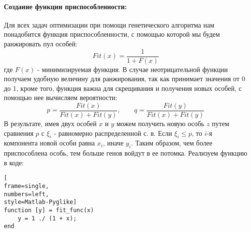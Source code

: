 \documentclass[12pt]{article}
\begin{document}
\paragraph{Создание функции приспособленности:} Для всех задач оптимизации при помощи генетического алгоритма нам понадобится функция приспособленности, с помощью которой мы будем ранжировать пул особей:
$$
Fit(x) = \frac{1}{1 + F(x)}
$$
где $F(x)$ - минимизируемая функция. В случае неотрицательной функции получаем удобную величину для ранжирования, так как принимает значения от 0 до 1, кроме того, функция важна для скрещивания и получения новых особей, с помощью нее вычисляем вероятности:
$$
p = \frac{Fit(x)}{Fit(x) + Fit(y)} , \qquad q = \frac{Fit(y)}{Fit(x) + Fit(y)}
$$
В результате, имея двух особей $x$ и $y$ можем получить новую особь $z$ путем сравнения $p$ с $\xi_i$ - равномерно распределенной с. в. Если $\xi_i \leq p$, то $i$-я компонента новой особи равна $x_i$, иначе $y_i$. Таким образом, чем более приспособлена особь, тем больше генов войдут в ее потомка. Реализуем функцию в коде:
\begin{lstlisting}[
frame=single,
numbers=left,
style=Matlab-Pyglike]
function [y] = fit_func(x)
    y = 1 ./ (1 + x);
end
\end{lstlisting}
\end{document}
